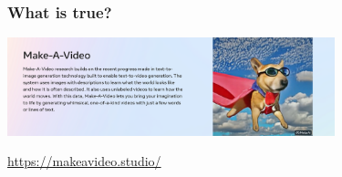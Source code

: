 \documentclass[17pt,aspectratio=169,hyperref={pdfusetitle,colorlinks,allcolors=olive}]{beamer}
\begin{document}
\begin{frame}[fragile]
  \frametitle{What is true?}

    \begin{center}
    \includegraphics[width=9.5cm]{figs/makeavideo}
  \end{center}
  
  \begin{flushright}
    {\scriptsize
      \url{https://makeavideo.studio/}
    }
  \end{flushright}

  
\end{frame}





  



  

\end{document}
